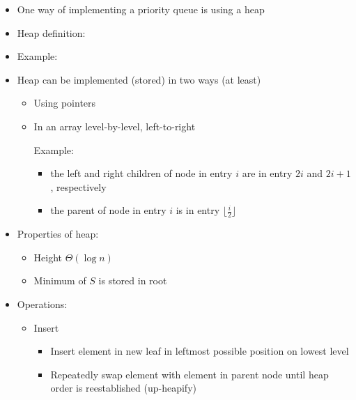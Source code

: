 \documentclass[11pt]{article}
\begin{document}
\begin{itemize}
\item One way of implementing a priority queue is using a heap
\item Heap definition:


\item Example:

\vspace{.5\baselineskip}


\item Heap can be implemented (stored) in two ways (at least)
        \begin{itemize}
        \item Using pointers
        \item In an array level-by-level, left-to-right

        Example:

        \vspace{.5\baselineskip}


                \begin{itemize}
                \item the left and right children of node in entry $i$
                are in entry $2i$ and $2i+1$, respectively
	      \item the parent of node in entry $i$ is in entry
	      $\lfloor \frac{i}{2} \rfloor$
                \end{itemize}
        \end{itemize}
\item Properties of heap:
        \begin{itemize}
        \item Height $\Theta(\log n)$
        \item Minimum of $S$ is stored in root
        \end{itemize}
\item Operations:
        \begin{itemize}
        \item  {\sc Insert}
                \begin{itemize}
                \item Insert element in new leaf in leftmost possible
                position on lowest level
                \item Repeatedly swap element with element in parent node
                until heap order is reestablished ({\sc up-heapify})
		

\end{itemize}
\end{itemize}
\end{itemize}
\end{document}
